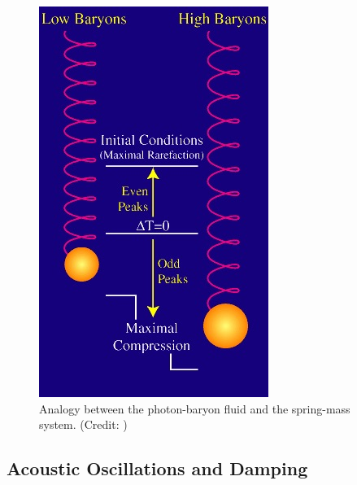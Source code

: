 \documentclass{article}
\begin{document}
\begin{figure}
\centering
\includegraphics[scale=0.4]{baryonspring}
\caption{Analogy between the photon-baryon fluid and the spring-mass system. (Credit: \cite{huweb})}
\label{baryon_spring}
\end{figure}
%
%
%
\subsection{Acoustic Oscillations and Damping}
\end{document}

